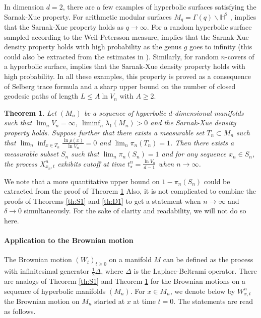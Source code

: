 \documentclass[]{scrartcl}
\newcommand{\dH}{\mathds H}
\newtheorem{theorem}{Theorem}[section]
\numberwithin{equation}{section}
\numberwithin{figure}{section}
\begin{document}
In dimension $d=2$, there are a few examples of hyperbolic surfaces satisfying the Sarnak-Xue property. For arithmetic modular surfaces $M_q = \Gamma(q) \backslash \dH^2$ , \cite[Corollary 1]{MR1131400} implies that the Sarnak-Xue property holds as $q \to \infty$. For a random hyperbolic surface sampled according to the Weil-Petersson measure, \cite[Theorem 2]{MR4408435} implies that the Sarnak-Xue density property holds with high probability as the genus $g$ goes to infinity (this could also be extracted from the estimates in \cite{MR4718401,anantharaman2023friedmanramanujanfunctionsrandomhyperbolic}). Similarly, for random $n$-covers of a hyperbolic surface, \cite[Theorem 1.8]{MR4431124} implies that the Sarnak-Xue density property holds with high probability. In all these examples, this property is proved as a consequence of Selberg trace formula and a sharp upper bound on the number of closed geodesic paths of length $L \leq A \ln V_n$ with $A \geq 2$.


\begin{theorem}{}\label{th:S2}
	Let $(M_n)$ be a sequence of hyperbolic $d$-dimensional manifolds such that  $\lim_n V_n = \infty$, $\liminf_n \lambda_1(M_n) >0$ and the Sarnak-Xue density property holds. Suppose further that there exists a measurable set $T_n \subset M_n$ such that $\lim_n \inf_{x \in T_n} \frac{\ln \rho(x)}{ \ln V_n} = 0$ and $\lim_n \pi_n(T_n) = 1$. Then there exists a measurable subset $S_n $ such that $\lim_n \pi_n(S_n) =1$ and for any sequence $x_n \in S_n$, the process $X^n_{x_n,t}$ exhibits cutoff at time $t^n_\star = \frac{\ln V_n}{d-1}$ when $n \to \infty$.
\end{theorem}

	

We note that a more quantitative upper bound on $1 - \pi_n(S_n)$ could be extracted from the proof of Theorem \ref{th:S2} Also, it is not complicated to combine the proofs of Theorems \ref{th:S1} and \ref{th:D1} to get a statement when $n \to \infty$ and $\delta \to 0$ simultaneously. For the sake of clarity and readability, we will not do so here.

\paragraph{Application to the Brownian motion}	
The Brownian motion $(W_t)_{t \geq 0}$ on a manifold $M$ can be defined as the process with infinitesimal generator $\frac{1}{2}\Delta$, where $\Delta$ is the Laplace-Beltrami operator.	There are analogs of Theorem \ref{th:S1} and Theorem \ref{th:S2} for the Brownian motions on a sequence of hyperbolic manifolds $(M_n)$. For $x \in M_n$, we denote below by $W^n_{x,t}$ the Brownian motion on $M_n$ started at $x$ at time $t =0$. The statements are read as follows.
\end{document}
